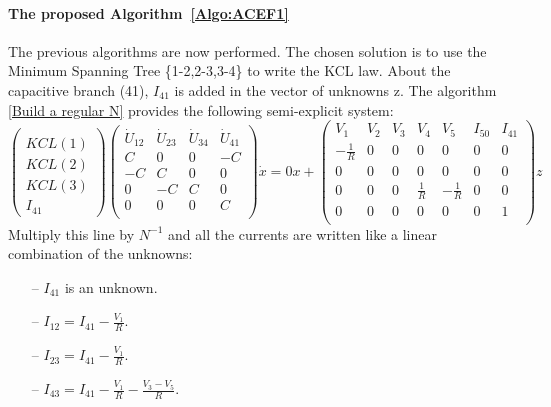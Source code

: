 \paragraph{The proposed Algorithm~\ref{Algo:ACEF1}}
The previous algorithms are now performed. The chosen solution is to use the Minimum
Spanning Tree \{1-2,2-3,3-4\} to write the KCL law. About the capacitive branch (41), $I_{41}$ is
added in the vector of unknowns z.
The algorithm \ref{Build a regular N} provides the following semi-explicit system: 
\[\left(\begin{array}{c}
  \\
KCL(1)\\KCL(2)\\KCL(3)\\I_{41}
\end{array}\right)
\left(\begin{array}{cccc}
  \dot U_{12}&\dot U_{23}&\dot U_{34}&\dot U_{41}\\
  \hline
  C&0&0&-C\\
  -C&C&0&0\\
  0&-C&C&0\\
  0&0&0&C\\  
\end{array}\right) \dot x=0x+
\left(\begin{array}{ccccccc}
  V_{1}&V_{2}&V_{3}&V_{4}&V_{5}&I_{50}&I_{41}\\
  \hline
  -\frac{1}{R}&0&0&0&0&0&0\\
  0&0&0&0&0&0&0\\
  0&0&0&\frac{1}{R}&-\frac{1}{R}&0&0\\
  0&0&0&0&0&0&1\\
\end{array}\right)z
\]
Multiply this line by $N^{-1}$ and all the currents are written like a linear combination of the
unknowns:
\begin{enumerate}
\item [--] $I_{41}$ is an unknown.
\item [--] $I_{12}=I_{41}-\frac{V_1}{R}$.
\item [--] $I_{23}=I_{41}-\frac{V_1}{R}$.
\item [--] $I_{43}=I_{41}-\frac{V_1}{R} - \frac{V_3-V_5}{R}$.
\end{enumerate}

